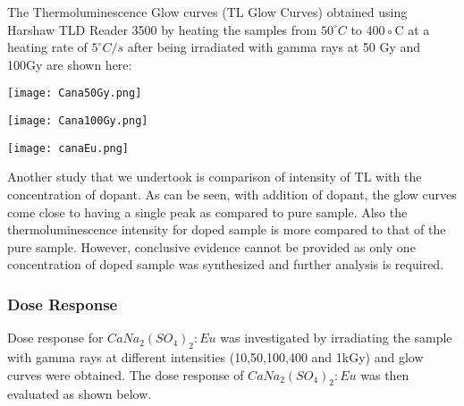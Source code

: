 \documentclass[../result.tex]{subfiles}
\begin{document}
    The Thermoluminescence Glow curves (TL Glow Curves) obtained using Harshaw TLD Reader 3500 by heating
    the samples from $50^{\circ}C$ to 400◦C at a heating rate of $5^{\circ}C/s$ after being irradiated with gamma
    rays at 50 Gy and 100Gy are shown here:

    \FloatBarrier\begin{multicols}{2}
        \begin{Figure}
            \centering
            \texttt{[image: Cana50Gy.png]}
            \label{fig:Cana50Gy}
        \end{Figure}
        \begin{Figure}
            \centering
            \texttt{[image: Cana100Gy.png]}
            \label{fig:Cana100Gy}
        \end{Figure}
    \end{multicols}
    \begin{Figure}
        \centering
        \texttt{[image: canaEu.png]}
        \label{fig:canaEu}
    \end{Figure}

    Another study that we undertook is comparison of intensity of TL with the concentration of dopant. As
    can be seen, with addition of dopant, the glow curves come close to having a single peak as compared to pure
    sample. Also the thermoluminescence intensity for doped sample is more compared to that of the pure sample.
    However, conclusive evidence cannot be provided as only one concentration of doped sample was synthesized
    and further analysis is required.

    \subsubsection{Dose Response}
        Dose response for $CaNa_2{(SO_4)}_2:Eu$ was investigated by irradiating the sample with gamma rays at different
        intensities (10,50,100,400 and 1kGy) and glow curves were obtained. The dose response of $CaNa_2{(SO_4)}_2:Eu$ was
        then evaluated as shown below.
    
\end{document}
